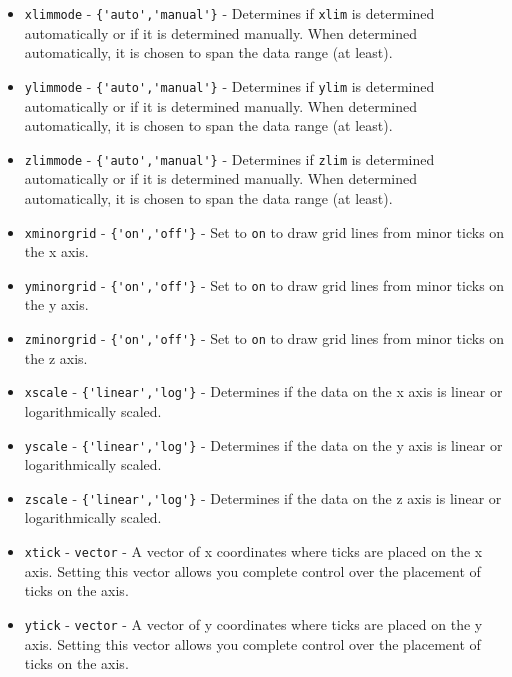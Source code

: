 \begin{itemize}
\item  \verb|xlimmode| - \verb|{'auto','manual'}| - Determines if \verb|xlim| is determined
 automatically or if it is determined manually.  When determined automatically, it
 is chosen to span the data range (at least).

\item  \verb|ylimmode| - \verb|{'auto','manual'}| - Determines if \verb|ylim| is determined
 automatically or if it is determined manually.  When determined automatically, it
 is chosen to span the data range (at least).

\item  \verb|zlimmode| - \verb|{'auto','manual'}| - Determines if \verb|zlim| is determined
 automatically or if it is determined manually.  When determined automatically, it
 is chosen to span the data range (at least).

\item  \verb|xminorgrid| - \verb|{'on','off'}| - Set to \verb|on| to draw grid lines from minor ticks on
 the x axis.

\item  \verb|yminorgrid| - \verb|{'on','off'}| - Set to \verb|on| to draw grid lines from minor ticks on
 the y axis.

\item  \verb|zminorgrid| - \verb|{'on','off'}| - Set to \verb|on| to draw grid lines from minor ticks on
 the z axis.

\item  \verb|xscale| - \verb|{'linear','log'}| - Determines if the data on the x axis is linear or
 logarithmically scaled.

\item  \verb|yscale| - \verb|{'linear','log'}| - Determines if the data on the y axis is linear or
 logarithmically scaled.

\item  \verb|zscale| - \verb|{'linear','log'}| - Determines if the data on the z axis is linear or
 logarithmically scaled.

\item  \verb|xtick| - \verb|vector| - A vector of x coordinates where ticks are placed on the 
 x axis.  Setting this vector allows you complete control over the placement of ticks on 
 the axis.

\item  \verb|ytick| - \verb|vector| - A vector of y coordinates where ticks are placed on the 
 y axis.  Setting this vector allows you complete control over the placement of ticks on 
 the axis.


\end{itemize}

